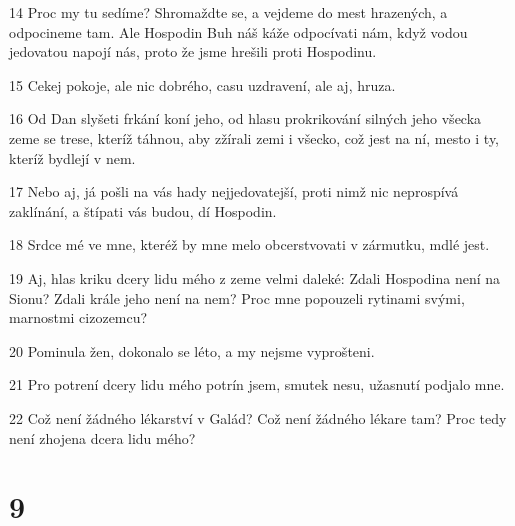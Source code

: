 \par 14 Proc my tu sedíme? Shromaždte se, a vejdeme do mest hrazených, a odpocineme tam. Ale Hospodin Buh náš káže odpocívati nám, když vodou jedovatou napojí nás, proto že jsme hrešili proti Hospodinu.
\par 15 Cekej pokoje, ale nic dobrého, casu uzdravení, ale aj, hruza.
\par 16 Od Dan slyšeti frkání koní jeho, od hlasu prokrikování silných jeho všecka zeme se trese, kteríž táhnou, aby zžírali zemi i všecko, což jest na ní, mesto i ty, kteríž bydlejí v nem.
\par 17 Nebo aj, já pošli na vás hady nejjedovatejší, proti nimž nic neprospívá zaklínání, a štípati vás budou, dí Hospodin.
\par 18 Srdce mé ve mne, kteréž by mne melo obcerstvovati v zármutku, mdlé jest.
\par 19 Aj, hlas kriku dcery lidu mého z zeme velmi daleké: Zdali Hospodina není na Sionu? Zdali krále jeho není na nem? Proc mne popouzeli rytinami svými, marnostmi cizozemcu?
\par 20 Pominula žen, dokonalo se léto, a my nejsme vyprošteni.
\par 21 Pro potrení dcery lidu mého potrín jsem, smutek nesu, užasnutí podjalo mne.
\par 22 Což není žádného lékarství v Galád? Což není žádného lékare tam? Proc tedy není zhojena dcera lidu mého?

\chapter{9}

